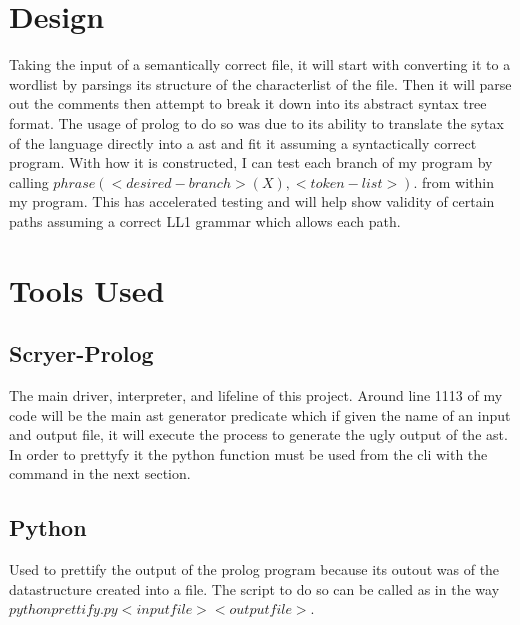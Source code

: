 \documentclass{article}
\begin{document}
\section{Design}
Taking the input of a semantically correct file, it will start with converting it to a wordlist by parsings its structure of the characterlist of the file. Then it will parse out the comments then attempt to break it down into its abstract syntax tree format. The usage of prolog to do so was due to its ability to translate the sytax of the language directly into a ast and fit it assuming a syntactically correct program. With how it is constructed, I can test each branch of my program by calling $phrase(<desired-branch>(X),<token-list>).$ from within my program. This has accelerated testing and will help show validity of certain paths assuming a correct LL1 grammar which allows each path.
\section{Tools Used}
\subsection{Scryer-Prolog}
The main driver, interpreter, and lifeline of this project. Around line 1113 of my code will be the main ast generator predicate which if given the name of an input and output file, it will execute the process to generate the ugly output of the ast. In order to prettyfy it the python function must be used from the cli with the command in the next section.
\subsection{Python}
Used to prettify the output of the prolog program because its outout was of the datastructure created into a file. The script to do so can be called as in the way $python prettify.py <input file> <output file>$.
\end{document}
